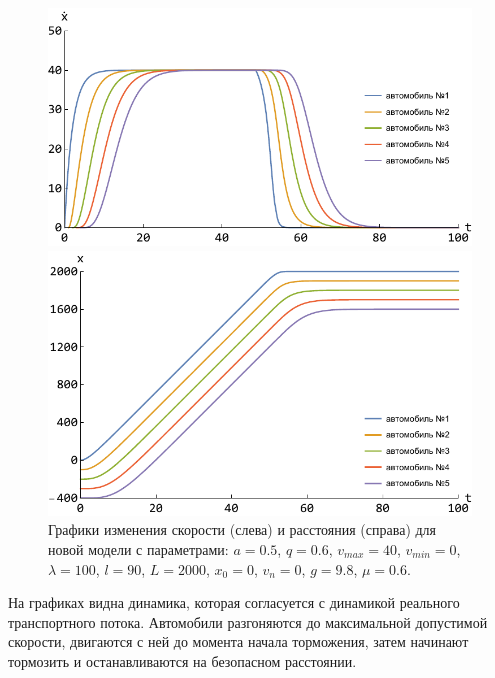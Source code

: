 \documentclass[12pt, a4paper]{extarticle}
\numberwithin{equation}{section}
\numberwithin{figure}{section}
\begin{document}
\begin{figure}[h!]
	\begin{center}
		\begin{minipage}[h!]{0.48\linewidth}
			\includegraphics[width=1\linewidth,height=0.2\textheight]
			{Images/new_model_speed.pdf}
		\end{minipage}
		\hfill 
		\begin{minipage}[h!]{0.48\linewidth}
			\includegraphics[width=1\linewidth,height=0.2\textheight]
			{Images/new_model_distanse.pdf}
		\end{minipage}
		\caption{Графики изменения скорости (слева) и расстояния (справа) для новой модели с параметрами: $a=0.5$, $q=0.6$, $v_{max}=40$, $v_{min}=0$, $\lambda=100$, $l=90$, $L=2000$, $x_0=0$, $v_n=0$, $g=9.8$, $\mu=0.6$. }
		\label{new_model_picture}
	\end{center}
\end{figure}

На графиках видна динамика, которая согласуется с динамикой реального транспортного потока. Автомобили разгоняются до максимальной допустимой скорости, двигаются с ней до момента начала торможения, затем начинают тормозить и останавливаются на безопасном расстоянии. 
\end{document}
